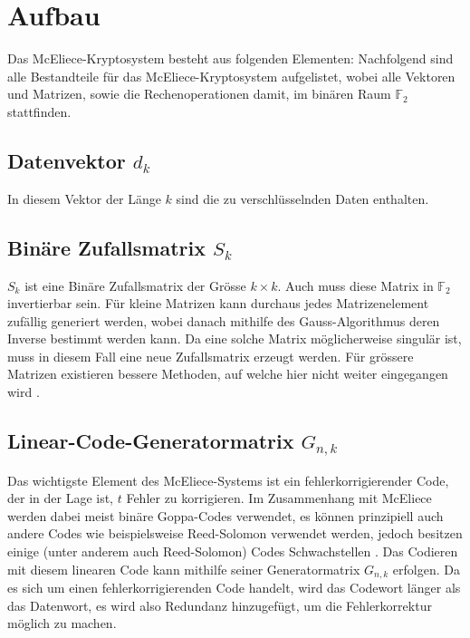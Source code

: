 %
%
%
\section{Aufbau\label{mceliece:section:Aufbau}}
Das McEliece-Kryptosystem besteht aus folgenden Elementen:
Nachfolgend sind alle Bestandteile für das McEliece-Kryptosystem aufgelistet,
wobei alle Vektoren und Matrizen, sowie die Rechenoperationen damit,
im binären Raum $\mathbb{F}_2$ stattfinden.

\subsection{Datenvektor $d_k$
\label{mceliece:subsection:d_k}}
In diesem Vektor der Länge $k$ sind die zu verschlüsselnden Daten enthalten.

\subsection{Binäre Zufallsmatrix $S_k$
\label{mceliece:subsection:s_k}}
$S_k$ ist eine Binäre Zufallsmatrix der Grösse $k \times k$.
Auch muss diese Matrix in $\mathbb{F}_2$ invertierbar sein.
Für kleine Matrizen kann durchaus jedes Matrizenelement zufällig generiert werden,
wobei danach mithilfe des Gauss-Algorithmus deren Inverse bestimmt werden kann.
Da eine solche Matrix möglicherweise singulär ist, muss in diesem Fall eine neue Zufallsmatrix erzeugt werden.
Für grössere Matrizen existieren bessere Methoden, auf welche hier nicht weiter eingegangen wird \cite{mceliece:GenerationRandMatrix}.

\subsection{Linear-Code-Generatormatrix $G_{n,k}$
\label{mceliece:subsection:g_nk}}
Das wichtigste Element des McEliece-Systems ist ein fehlerkorrigierender Code,
der in der Lage ist, $t$ Fehler zu korrigieren.
Im Zusammenhang mit McEliece werden dabei meist binäre Goppa-Codes \cite{mceliece:goppa} verwendet,
es können prinzipiell auch andere Codes wie beispielsweise Reed-Solomon verwendet werden,
jedoch besitzen einige (unter anderem auch Reed-Solomon) Codes Schwachstellen \cite{mceliece:lorenz}.
Das Codieren mit diesem linearen Code kann mithilfe seiner Generatormatrix $G_{n,k}$ erfolgen.
Da es sich um einen fehlerkorrigierenden Code handelt,
wird das Codewort länger als das Datenwort,
es wird also Redundanz hinzugefügt,
um die Fehlerkorrektur möglich zu machen.

